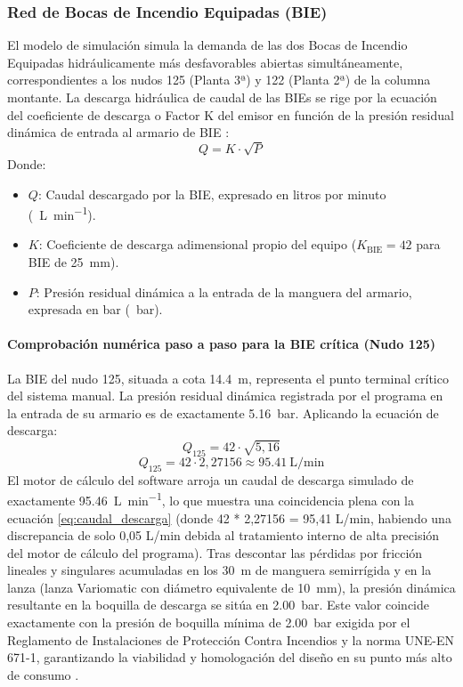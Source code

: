 \documentclass[12pt,a4paper]{article}
\begin{document}
\subsubsection{Red de Bocas de Incendio Equipadas (BIE)}

El modelo de simulación simula la demanda de las dos Bocas de Incendio Equipadas hidráulicamente más desfavorables abiertas simultáneamente, correspondientes a los nudos 125 (Planta 3ª) y 122 (Planta 2ª) de la columna montante. La descarga hidráulica de caudal de las BIEs se rige por la ecuación del coeficiente de descarga o Factor K del emisor en función de la presión residual dinámica de entrada al armario de BIE \parencite{UNE_EN_671_1,IMP_WORKFIRE_300B2}:
\begin{equation}
Q = K \cdot \sqrt{P}
\label{eq:caudal_descarga}
\end{equation}
Donde:
\begin{itemize}
	\item $Q$: Caudal descargado por la BIE, expresado en litros por minuto (\SI{}{\liter\per\minute}).
	\item $K$: Coeficiente de descarga adimensional propio del equipo ($K_{\text{BIE}} = 42$ para BIE de \SI{25}{\milli\meter}).
	\item $P$: Presión residual dinámica a la entrada de la manguera del armario, expresada en bar (\SI{}{\bar}).
\end{itemize}

\paragraph{Comprobación numérica paso a paso para la BIE crítica (Nudo 125)}
La BIE del nudo 125, situada a cota \SI{14.4}{\meter}, representa el punto terminal crítico del sistema manual. La presión residual dinámica registrada por el programa en la entrada de su armario es de exactamente \SI{5.16}{\bar}. Aplicando la ecuación de descarga:
\[ Q_{125} = 42 \cdot \sqrt{5,16} \]
\[ Q_{125} = 42 \cdot 2,27156 \approx \SI{95.41}{\liter\per\minute} \]
El motor de cálculo del software arroja un caudal de descarga simulado de exactamente \SI{95.46}{\liter\per\minute}, lo que muestra una coincidencia plena con la ecuación \ref{eq:caudal_descarga} (donde 42 * 2,27156 = 95,41 L/min, habiendo una discrepancia de solo 0,05 L/min debida al tratamiento interno de alta precisión del motor de cálculo del programa). Tras descontar las pérdidas por fricción lineales y singulares acumuladas en los \SI{30}{\meter} de manguera semirrígida y en la lanza (lanza Variomatic con diámetro equivalente de \SI{10}{\milli\meter}), la presión dinámica resultante en la boquilla de descarga se sitúa en \SI{2.00}{\bar}. Este valor coincide exactamente con la presión de boquilla mínima de \SI{2.00}{\bar} exigida por el Reglamento de Instalaciones de Protección Contra Incendios y la norma UNE-EN 671-1, garantizando la viabilidad y homologación del diseño en su punto más alto de consumo \parencite{RIPCI_GUIA_2022,UNE_EN_671_1}.
\end{document}
